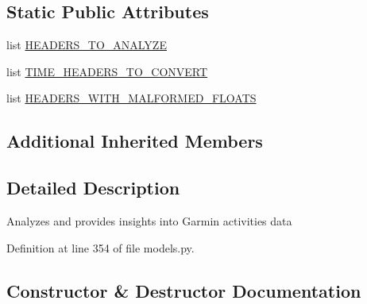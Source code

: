 \subsection*{Static Public Attributes}
\begin{DoxyCompactItemize}
\item 
list \hyperlink{classpygce_1_1analysis_1_1models_1_1_activities_data_analysis_a799ad90125cc686b985fe525a3b33062}{H\+E\+A\+D\+E\+R\+S\+\_\+\+T\+O\+\_\+\+A\+N\+A\+L\+Y\+ZE}
\item 
list \hyperlink{classpygce_1_1analysis_1_1models_1_1_activities_data_analysis_a2f0ccc7899b8c6b6d94391c80f5def1d}{T\+I\+M\+E\+\_\+\+H\+E\+A\+D\+E\+R\+S\+\_\+\+T\+O\+\_\+\+C\+O\+N\+V\+E\+RT}
\item 
list \hyperlink{classpygce_1_1analysis_1_1models_1_1_activities_data_analysis_a272e010f956a64a8f916ebf1b9e14255}{H\+E\+A\+D\+E\+R\+S\+\_\+\+W\+I\+T\+H\+\_\+\+M\+A\+L\+F\+O\+R\+M\+E\+D\+\_\+\+F\+L\+O\+A\+TS}
\end{DoxyCompactItemize}
\subsection*{Additional Inherited Members}


\subsection{Detailed Description}
\begin{DoxyVerb}Analyzes and provides insights into Garmin activities data \end{DoxyVerb}
 

Definition at line 354 of file models.\+py.



\subsection{Constructor \& Destructor Documentation}
\mbox{\label{classpygce_1_1analysis_1_1models_1_1_activities_data_analysis_a6196617473672f614453a357bcb09799}} 
